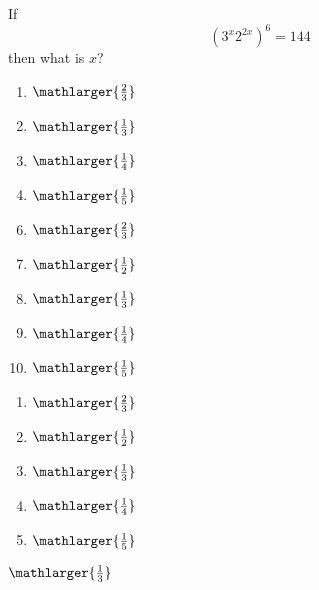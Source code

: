 


  If \[(3^{x}2^{2x})^6=144\] then what is $x$?


\ifsat
	\begin{enumerate}[label=\Alph*)]
		\item   $\mathlarger{\frac{2}{3}}$
		\item  $\mathlarger{\frac{1}{3}}$%
		\item  $\mathlarger{\frac{1}{4}}$
		\item   $\mathlarger{\frac{1}{5}}$
	\end{enumerate}
\else
\fi

\ifacteven
	\begin{enumerate}[label=\textbf{\Alph*.},itemsep=\fill,align=left]
		\setcounter{enumii}{5}
		\item   $\mathlarger{\frac{2}{3}}$
		\item  $\mathlarger{\frac{1}{2}}$
		\item  $\mathlarger{\frac{1}{3}}$%
		\addtocounter{enumii}{1}
		\item  $\mathlarger{\frac{1}{4}}$
		\item   $\mathlarger{\frac{1}{5}}$
	\end{enumerate}
\else
\fi

\ifactodd
	\begin{enumerate}[label=\textbf{\Alph*.},itemsep=\fill,align=left]
		\item   $\mathlarger{\frac{2}{3}}$
		\item  $\mathlarger{\frac{1}{2}}$
		\item  $\mathlarger{\frac{1}{3}}$%
		\item  $\mathlarger{\frac{1}{4}}$
		\item   $\mathlarger{\frac{1}{5}}$
	\end{enumerate}
\else
\fi

\ifgridin
  $\mathlarger{\frac{1}{3}}$%
		
\else
\fi

